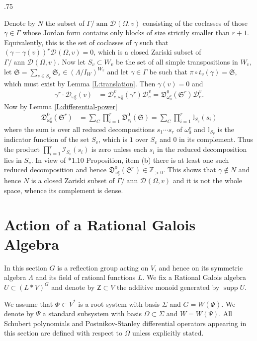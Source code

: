 \documentclass[11pt,fleqn]{amsart}
\makeatletter
\renewcommand\proofname{Proof}
\renewenvironment{proof}[1][\textit{\proofname}]{\par
 \pushQED{\qed}%
 \normalfont \topsep.75\paraskip\relax
 \trivlist
 \item[\hskip\labelsep
 \itshape
 #1\@addpunct{.}]\ignorespaces
}{%
 \popQED\endtrivlist\@endpefalse
}
\newcounter{para}[section]
\newcommand\ZZ{\mathbb Z}
\newcommand\D[3]{{}^{#1} \mathfrak D_{#2}^{#3}}
\newcommand\DD[3]{{}^{#1} \mathcal D_{#2}^{#3}}
\newcommand\Z{\mathsf Z}
\renewcommand\SS{\mathfrak S}
\DeclareMathOperator\ann{ann}
\DeclareMathOperator\supp{supp}
\makeatother
\begin{document}
\begin{proof}
Denote by $N$ the subset of $\Gamma / \ann \DD{}{}{}(\Omega, v)$ consisting of
the coclasses of those $\gamma \in \Gamma$ whose Jordan form contains only 
blocks of size strictly smaller than $r + 1$. Equivalently, 
this is the set of coclasses of $\gamma$ such that $(\gamma - 
\gamma(v))^{r} \DD{}{}{}(\Omega, v) = 0$, which is a closed 
Zariski subset of $\Gamma / \ann \DD{}{}{}(\Omega, v)$. Now let $S_v \subset 
W_v$ be the set of all simple transpositions in $W_v$, let $\SS = 
\sum_{s \in S_v} \SS_s \in (\Lambda/I_W)^{W_v}$ and let $\gamma \in \Gamma$
be such that $\pi \circ t_v(\gamma) = \SS$, which must exist by Lemma 
\ref{L:translation}. Then $\gamma(v) = 0$ and
\begin{align*}
\gamma^{r} \cdot \DD{}{\omega_0^v}{}(v)
	&= \DD{}{e,\omega_0^v}{v}(\gamma^{r}) \DD{}{e}{v}
	= \D{}{\omega_0^v}{0}(\SS^{r}) \DD{}{e}{v}.
\end{align*}
Now by Lemma \ref{L:differential-power} 
\begin{align*}
\D{}{\omega_0^v}{0}(\SS^{r})
	&= \sum_{C} \prod_{i=1}^{r} \D{}{s_i}{0}(\SS)
	= \sum_{C} \prod_{i=1}^{r} \mathbb I_{S_v}(s_i)
\end{align*}
where the sum is over all reduced decompositions $s_1 \cdots s_{r}$ of 
$\omega_0^v$ and $\mathbb I_{S_v}$ is the indicator function of the set $S_v$,
which is $1$ over $S_v$ and $0$ in its complement. Thus the product 
$\prod_{i=1}^{r} \mathcal I_{S_v}(s_i)$ is zero unless each $s_i$ in the 
reduced decomposition lies in $S_v$. In view of 
\cite{Hump-coxeter-book}*{1.10 Proposition, item (b)} there is at least one
such reduced decomposition and hence $\D{}{\omega_0^v}{0}(\SS^{r}) \in 
\ZZ_{>0}$. This shows that $\gamma \notin N$ and hence $N$ is a closed Zariski
subset of $\Gamma/ \ann \DD{}{}{}(\Omega, v)$ and it is not the whole space, 
whence its complement is dense.
\end{proof}


\section{Action of a Rational Galois Algebra}
In this section $G$ is a reflection group acting on $V$, and hence on its 
symmetric algebra $\Lambda$ and its field of rational functions $L$. We fix
a Rational Galois algebra $U \subset (L*V)^G$ and denote by $\Z \subset V$ the 
additive monoid generated by $\supp U$. 

We assume that $\Phi \subset V^*$ is a root system with basis $\Sigma$ and 
$G = W(\Phi)$. We denote by $\Psi$ a standard subsystem with basis $\Omega
\subset \Sigma$ and $W = W(\Psi)$. All Schubert polynomials and 
Postnikov-Stanley differential operators appearing in this section are defined 
with respect to $\Omega$ unless explicitly stated.
\end{document}
